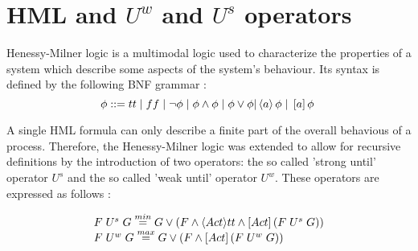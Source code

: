 \section{HML and $U^{w}$ and $U^{s}$ operators}

Henessy-Milner logic \cite{HenessyMilner} is a multimodal logic used to characterize the properties of a system which describe some aspects of the system's behaviour. Its syntax is defined by the following BNF grammar \cite{ModelingAndAnalysis2}:
\begin{equation}\label{eq:hml_bnf}
\phi ::= tt \hspace{1 mm} | \hspace{1 mm} ff \hspace{1 mm} | \hspace{1 mm} \neg\phi \hspace{1 mm} | \hspace{1 mm}\phi\wedge\phi \hspace{1 mm} |
\hspace{1 mm} \phi\vee\phi | \left\langle a\right\rangle \phi \hspace{1 mm} | \hspace{1 mm} \left[a\right]\phi \hspace{1 mm}
\end{equation}

A single HML formula can only describe a finite part of the overall behavious of a process. Therefore, the Henessy-Milner logic was extended to allow for recursive definitions by the introduction of two operators: the so called 'strong until' operator $U^{s}$ and the so called 'weak until' operator $U^{w}$. These operators are expressed as follows \cite{ReactiveSystems5}:

\begin{equation}
	\begin{array}{lcl}
		F \hspace{1 mm} U^{s} \hspace{1 mm} G \stackrel{min}{=} G \vee \left(F \wedge \langle Act \rangle tt \wedge \left[Act\right]\left(F \hspace{1 mm} U^{s} \hspace{1 mm} G\right)\right)\\
		F \hspace{1 mm} U^{w} \hspace{1 mm} G \stackrel{max}{=} G \vee \left(F \wedge \left[Act\right] \left(F \hspace{1 mm} U^{w} \hspace{1 mm} G\right)\right)
	\end{array}
\end{equation}

